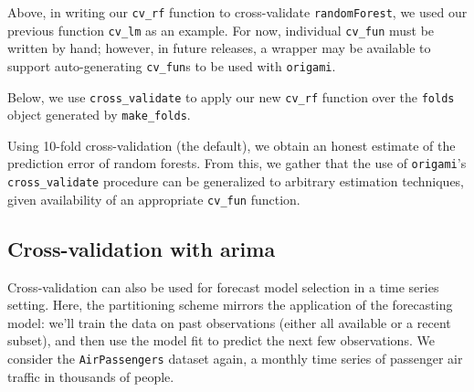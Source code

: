 \documentclass[12pt, krantz2,]{book}
\newenvironment{Shaded}{\begin{snugshade}}{\end{snugshade}}
\newcommand{\CommentTok}[1]{\textcolor[rgb]{0.56,0.35,0.01}{\textit{#1}}}
\newcommand{\DataTypeTok}[1]{\textcolor[rgb]{0.13,0.29,0.53}{#1}}
\newcommand{\KeywordTok}[1]{\textcolor[rgb]{0.13,0.29,0.53}{\textbf{#1}}}
\newcommand{\NormalTok}[1]{#1}
\newcommand{\OperatorTok}[1]{\textcolor[rgb]{0.81,0.36,0.00}{\textbf{#1}}}
\newcommand{\OtherTok}[1]{\textcolor[rgb]{0.56,0.35,0.01}{#1}}
\newcommand{\StringTok}[1]{\textcolor[rgb]{0.31,0.60,0.02}{#1}}
\theoremstyle{definition}
\theoremstyle{definition}
\theoremstyle{definition}
\newcommand{\1}{\mathbbm{1}}
\begin{document}
Above, in writing our \texttt{cv\_rf} function to cross-validate \texttt{randomForest}, we used
our previous function \texttt{cv\_lm} as an example. For now, individual \texttt{cv\_fun} must
be written by hand; however, in future releases, a wrapper may be available to
support auto-generating \texttt{cv\_fun}s to be used with \texttt{origami}.

Below, we use \texttt{cross\_validate} to apply our new \texttt{cv\_rf} function over the \texttt{folds}
object generated by \texttt{make\_folds}.

\begin{Shaded}
\end{Shaded}

Using 10-fold cross-validation (the default), we obtain an honest estimate of
the prediction error of random forests. From this, we gather that the use of
\texttt{origami}'s \texttt{cross\_validate} procedure can be generalized to arbitrary estimation
techniques, given availability of an appropriate \texttt{cv\_fun} function.

\hypertarget{cross-validation-with-arima}{%
\subsection{Cross-validation with arima}\label{cross-validation-with-arima}}

Cross-validation can also be used for forecast model selection in a time series
setting. Here, the partitioning scheme mirrors the application of the
forecasting model: we'll train the data on past observations (either all
available or a recent subset), and then use the model fit to predict the next
few observations. We consider the \texttt{AirPassengers} dataset again, a monthly time
series of passenger air traffic in thousands of people.
\end{document}
